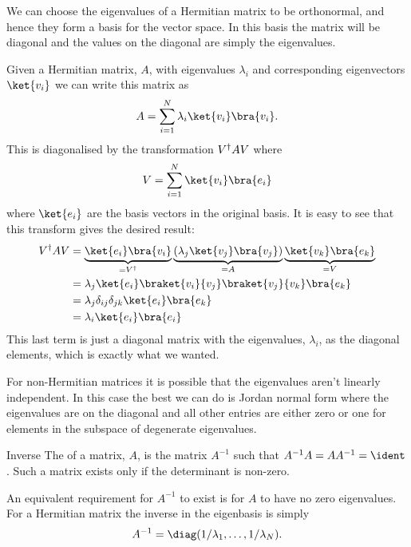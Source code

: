 We can choose the eigenvalues of a Hermitian matrix to be orthonormal, and hence they form a basis for the vector space.
In this basis the matrix will be diagonal and the values on the diagonal are simply the eigenvalues.

Given a Hermitian matrix, \(A\), with eigenvalues \(\lambda_i\) and corresponding eigenvectors \(\ket{v_i}\) we can write this matrix as
\begin{equation}
    A = \sum_{i=1}^{N} \lambda_i\ket{v_i}\bra{v_i}.
\end{equation}
This is diagonalised by the transformation \(V^\dagger A V\) where
\begin{equation}
    V = \sum_{i=1}^{N} \ket{v_i}\bra{e_i}
\end{equation}
where \(\ket{e_i}\) are the basis vectors in the original basis.
It is easy to see that this transform gives the desired result:
\begin{align}
    V^\hermit AV &= \underbrace{\ket{e_i}\bra{v_i}}_{=V^\hermit}  \underbrace{(\lambda_j \ket{v_j}\bra{v_j})}_{=A}\underbrace{\ket{v_k}\bra{e_k}}_{=V}\\
    &= \lambda_j \ket{e_i}\braket{v_i}{v_j}\braket{v_j}{v_k}\bra{e_k}\\
    &= \lambda_j \delta_{ij}\delta_{jk} \ket{e_i}\bra{e_k}\\
    &= \lambda_i \ket{e_i}\bra{e_i}
\end{align}
This last term is just a diagonal matrix with the eigenvalues, \(\lambda_i\), as the diagonal elements, which is exactly what we wanted.

For non-Hermitian matrices it is possible that the eigenvalues aren't linearly independent.
In this case the best we can do is Jordan normal form where the eigenvalues are on the diagonal and all other entries are either zero or one for elements in the subspace of degenerate eigenvalues.

\begin{dfn}{Inverse}{}
    The  of a matrix, \(A\), is the matrix \(A^{-1}\) such that \(A^{-1}A = AA^{-1} = \ident\).
    Such a matrix exists only if the determinant is non-zero.
\end{dfn}

An equivalent requirement for \(A^{-1}\) to exist is for \(A\) to have no zero eigenvalues.
For a Hermitian matrix the inverse in the eigenbasis is simply
\begin{equation}
    A^{-1} = \diag(1/\lambda_1, \dotsc, 1/\lambda_N).
\end{equation}

